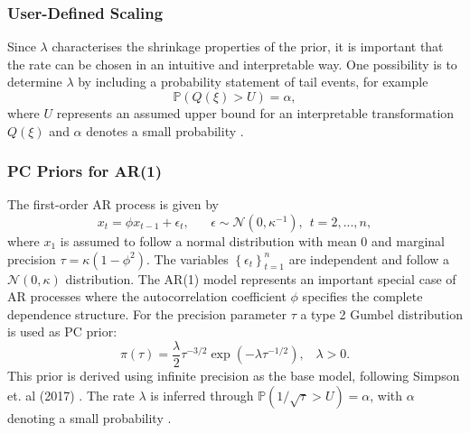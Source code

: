 \subsubsection*{User-Defined Scaling}
Since $\lambda$ characterises the shrinkage properties of the prior, it is important that the rate can be chosen in an intuitive and interpretable way. One possibility is to determine $\lambda$ by including a probability statement of tail events, for example
\begin{equation}
    \mathbb{P}\left(Q\left(\xi\right) > U\right)=\alpha,
\end{equation}
where $U$ represents an assumed upper bound for an interpretable transformation $Q\left(\xi\right)$ and $\alpha$ denotes a small probability \autocite[][]{simpson2017penalising}.
\subsubsection{PC Priors for AR(1)}
The first-order AR process is given by
\begin{equation}
    x_t=\phi x_{t-1}+\epsilon_t, \hspace{20pt}\epsilon\sim\mathcal{N}\left(0, \kappa^{-1}\right), \hspace{5pt} t=2,...,n,
\end{equation}
where $x_1$ is assumed to follow a normal distribution with mean $0$ and marginal precision $\tau=\kappa\left(1-\phi^2\right)$. The variables $\left\lbrace\epsilon_t\right\rbrace_{t=1}^n$ are independent and follow a $\mathcal{N}\left(0, \kappa\right)$ distribution. The AR(1) model represents an important special case of AR processes where the autocorrelation coefficient $\phi$ specifies the complete dependence structure. For the precision parameter $\tau$ a type 2 Gumbel distribution is used as PC prior:
\begin{equation*}
    \pi\left(\tau\right)=\frac{\lambda}{2}\tau^{-3/2}\exp\left(-\lambda\tau^{-1/2}\right), \hspace{10pt}\lambda>0.
\end{equation*}
This prior is derived using infinite precision as the base model, following Simpson et. al (2017) \autocite[][]{simpson2017penalising}. The rate $\lambda$ is inferred through $\mathbb{P}\left(1/\sqrt{\tau} > U\right)=\alpha$, with $\alpha$ denoting a small probability \autocite[][]{sorbye2017penalised}.

